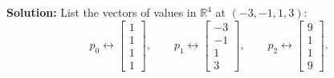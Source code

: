 \documentclass[11pt, letterpaper]{article}
\theoremstyle{definition}
\theoremstyle{remark}
\begin{document}
\textbf{Solution:}
List the vectors of values in $\mathbb{R}^4$ at $(-3, -1, 1, 3)$:
\[
    p_0 \leftrightarrow \begin{bmatrix} 1 \\ 1 \\ 1 \\ 1 \end{bmatrix}, \qquad
    p_1 \leftrightarrow \begin{bmatrix} -3 \\ -1 \\ 1 \\ 3 \end{bmatrix}, \qquad
    p_2 \leftrightarrow \begin{bmatrix} 9 \\ 1 \\ 1 \\ 9 \end{bmatrix}.
\]
\end{document}
